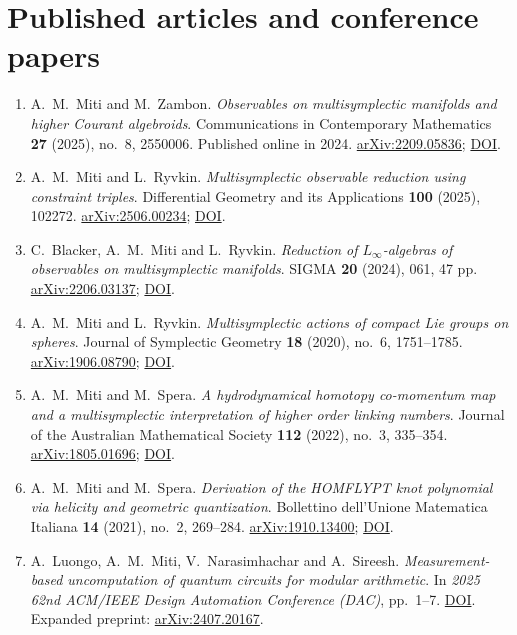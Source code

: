 \documentclass[11pt,a4paper]{article}
\begin{document}
\section*{Published articles and conference papers}
\begin{enumerate}
\item A.~M.~Miti and M.~Zambon. \emph{Observables on multisymplectic manifolds and higher Courant algebroids}. Communications in Contemporary Mathematics \textbf{27} (2025), no.~8, 2550006. Published online in 2024. \href{https://arxiv.org/abs/2209.05836}{arXiv:2209.05836}; \href{https://doi.org/10.1142/S0219199725500063}{DOI}.
\item A.~M.~Miti and L.~Ryvkin. \emph{Multisymplectic observable reduction using constraint triples}. Differential Geometry and its Applications \textbf{100} (2025), 102272. \href{https://arxiv.org/abs/2506.00234}{arXiv:2506.00234}; \href{https://doi.org/10.1016/j.difgeo.2025.102272}{DOI}.
\item C.~Blacker, A.~M.~Miti and L.~Ryvkin. \emph{Reduction of $L_\infty$-algebras of observables on multisymplectic manifolds}. SIGMA \textbf{20} (2024), 061, 47 pp. \href{https://arxiv.org/abs/2206.03137}{arXiv:2206.03137}; \href{https://doi.org/10.3842/SIGMA.2024.061}{DOI}.
\item A.~M.~Miti and L.~Ryvkin. \emph{Multisymplectic actions of compact Lie groups on spheres}. Journal of Symplectic Geometry \textbf{18} (2020), no.~6, 1751--1785. \href{https://arxiv.org/abs/1906.08790}{arXiv:1906.08790}; \href{https://doi.org/10.4310/JSG.2020.v18.n6.a6}{DOI}.
\item A.~M.~Miti and M.~Spera. \emph{A hydrodynamical homotopy co-momentum map and a multisymplectic interpretation of higher order linking numbers}. Journal of the Australian Mathematical Society \textbf{112} (2022), no.~3, 335--354. \href{https://arxiv.org/abs/1805.01696}{arXiv:1805.01696}; \href{https://doi.org/10.1017/S1446788720000518}{DOI}.
\item A.~M.~Miti and M.~Spera. \emph{Derivation of the HOMFLYPT knot polynomial via helicity and geometric quantization}. Bollettino dell'Unione Matematica Italiana \textbf{14} (2021), no.~2, 269--284. \href{https://arxiv.org/abs/1910.13400}{arXiv:1910.13400}; \href{https://doi.org/10.1007/s40574-020-00254-5}{DOI}.
\item A.~Luongo, A.~M.~Miti, V.~Narasimhachar and A.~Sireesh. \emph{Measurement-based uncomputation of quantum circuits for modular arithmetic}. In \emph{2025 62nd ACM/IEEE Design Automation Conference (DAC)}, pp.~1--7. \href{https://doi.org/10.1109/DAC63849.2025.11132981}{DOI}. Expanded preprint: \href{https://arxiv.org/abs/2407.20167}{arXiv:2407.20167}.
\end{enumerate}
\end{document}
